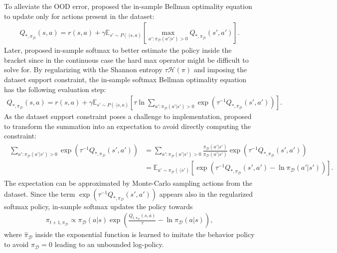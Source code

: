 \documentclass{article}
\newcommand{\AdaBracket}[1]{\left(#1\right)}
\newcommand{\AdaRectBracket}[1]{\left[#1\right]}
\newcommand{\expectation}[2]{\mathbb{E}_{#1}\AdaRectBracket{#2}}
\newcommand{\entropy}{\mathcal{H}\left( \pi \right)}
\newcommand{\datasetOptimalQ}{Q_{*, \pi_{\mathcal{D}}}}
\newcommand{\datasetPolicy}{\pi_{\mathcal{D}}}
\begin{document}
To alleviate the OOD error, \citet{Fujimoto2019-InSampleMax} proposed the in-sample Bellman optimality equation to update only for actions present in the dataset:
\begin{align}
    \datasetOptimalQ(s,a) = r(s,a) + \gamma \expectation{s'\sim P(\cdot | s,a)}{\max_{a': \datasetPolicy(a'|s') > 0} \datasetOptimalQ(s',a')}.
    \label{eq:hardmax_offline}
\end{align}
Later, \citet{Xiao2023-InSampleSoftmax} proposed in-sample softmax to better estimate the policy inside the bracket since in the continuous case the hard max operator might be difficult to solve for.
By regularizing with the Shannon entropy $\tau \entropy$ and imposing the dataset support constraint, the in-sample softmax Bellman optimality equation has the following evaluation step:
\begin{align}
    \datasetOptimalQ (s,a) = r(s,a) +  \gamma \expectation{s'\sim P(\cdot | s,a)}{\tau \ln \!\!\!\!\!\sum_{a': \datasetPolicy(a'|s') > 0} \!\!\!\!\! \exp\AdaBracket{\tau^{-1} \datasetOptimalQ(s',a')}}.
\end{align}
As the dataset support constraint poses a challenge to implementation, \citet{Xiao2023-InSampleSoftmax} proposed to transform the summation into an expectation to avoid directly computing the constraint: 
\begin{align}
    \begin{split}
    \sum_{a': \datasetPolicy(a'|s') > 0} \!\!\!\!\!\!\exp\AdaBracket{\tau^{-1}\datasetOptimalQ (s',a')} &= \!\!\!\!\!\!\sum_{a': \datasetPolicy(a'|s') > 0} \frac{\datasetPolicy(a'|s')}{\datasetPolicy(a'|s')} \exp\AdaBracket{\tau^{-1}\datasetOptimalQ (s',a')} \\
    &= \expectation{a'\sim\datasetPolicy(\cdot | s')}{\exp\AdaBracket{\tau^{-1}\datasetOptimalQ (s',a') - \ln\datasetPolicy(a'|s')}}.
    \end{split}
\end{align}
The expectation can be approximated by Monte-Carlo sampling actions from the dataset.
Since the term $\exp\AdaBracket{\tau^{-1}\datasetOptimalQ (s',a')}$ appears also in the regularized softmax policy, in-sample softmax updates the policy towards 
\begin{align}
    \pi_{t+1,\datasetPolicy} \propto  \datasetPolicy(a|s) \exp\AdaBracket{\frac{Q_{t, \datasetPolicy}(s,a)}{\tau} - \ln\hat{\pi}_{\mathcal{D}}(a|s)},
    \label{eq:inac_policy}
\end{align}
where $\hat{\pi}_{\mathcal{D}}$ inside the exponential function is learned to imitate the behavior policy to avoid $\pi_{\mathcal{D}} = 0$ leading to an unbounded log-policy.
\end{document}
